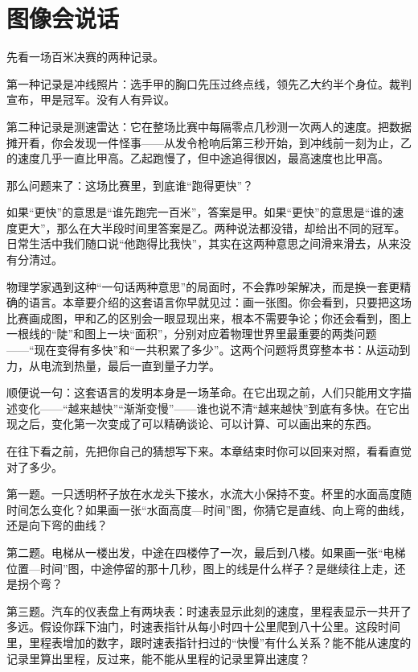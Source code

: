 \chapter{图像会说话}


先看一场百米决赛的两种记录。

第一种记录是冲线照片：选手甲的胸口先压过终点线，领先乙大约半个身位。裁判宣布，甲是冠军。没有人有异议。

第二种记录是测速雷达：它在整场比赛中每隔零点几秒测一次两人的速度。把数据摊开看，你会发现一件怪事——从发令枪响后第三秒开始，到冲线前一刻为止，乙的速度几乎一直比甲高。乙起跑慢了，但中途追得很凶，最高速度也比甲高。

那么问题来了：这场比赛里，到底谁“跑得更快”？

如果“更快”的意思是“谁先跑完一百米”，答案是甲。如果“更快”的意思是“谁的速度更大”，那么在大半段时间里答案是乙。两种说法都没错，却给出不同的冠军。日常生活中我们随口说“他跑得比我快”，其实在这两种意思之间滑来滑去，从来没有分清过。

物理学家遇到这种“一句话两种意思”的局面时，不会靠吵架解决，而是换一套更精确的语言。本章要介绍的这套语言你早就见过：画一张图。你会看到，只要把这场比赛画成图，甲和乙的区别会一眼显现出来，根本不需要争论；你还会看到，图上一根线的“陡”和图上一块“面积”，分别对应着物理世界里最重要的两类问题——“现在变得有多快”和“一共积累了多少”。这两个问题将贯穿整本书：从运动到力，从电流到热量，最后一直到量子力学。

顺便说一句：这套语言的发明本身是一场革命。在它出现之前，人们只能用文字描述变化——“越来越快”“渐渐变慢”——谁也说不清“越来越快”到底有多快。在它出现之后，变化第一次变成了可以精确谈论、可以计算、可以画出来的东西。


在往下看之前，先把你自己的猜想写下来。本章结束时你可以回来对照，看看直觉对了多少。

第一题。一只透明杯子放在水龙头下接水，水流大小保持不变。杯里的水面高度随时间怎么变化？如果画一张“水面高度—时间”图，你猜它是直线、向上弯的曲线，还是向下弯的曲线？

第二题。电梯从一楼出发，中途在四楼停了一次，最后到八楼。如果画一张“电梯位置—时间”图，中途停留的那十几秒，图上的线是什么样子？是继续往上走，还是拐个弯？

第三题。汽车的仪表盘上有两块表：时速表显示此刻的速度，里程表显示一共开了多远。假设你踩下油门，时速表指针从每小时四十公里爬到八十公里。这段时间里，里程表增加的数字，跟时速表指针扫过的“快慢”有什么关系？能不能从速度的记录里算出里程，反过来，能不能从里程的记录里算出速度？

